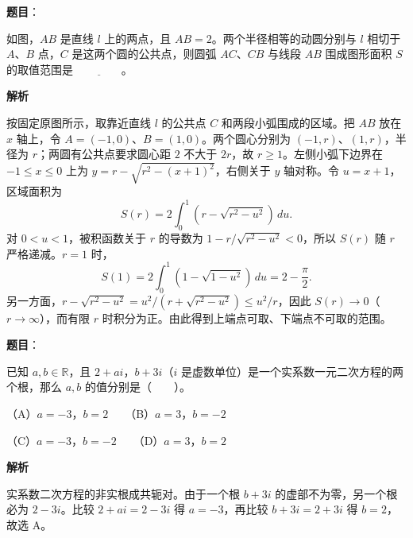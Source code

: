 \begin{answer}

\textbf{题目}：

如图，$AB$ 是直线 $l$ 上的两点，且 $AB=2$。两个半径相等的动圆分别与 $l$ 相切于 $A$、$B$ 点，$C$ 是这两个圆的公共点，则圆弧 $AC$、$CB$ 与线段 $AB$ 围成图形面积 $S$ 的取值范围是 $\underline{\qquad\qquad}$。
\nopagebreak[4]
\begin{center}\end{center}
\nopagebreak[4]
\textbf{解析}

按固定原图所示，取靠近直线 $l$ 的公共点 $C$ 和两段小弧围成的区域。把 $AB$ 放在 $x$ 轴上，令 $A=(-1,0)$、$B=(1,0)$。两个圆心分别为 $(-1,r)$、$(1,r)$，半径为 $r$；两圆有公共点要求圆心距 $2$ 不大于 $2r$，故 $r\ge1$。左侧小弧下边界在 $-1\le x\le0$ 上为 $y=r-\sqrt{r^2-(x+1)^2}$，右侧关于 $y$ 轴对称。令 $u=x+1$，区域面积为
\nopagebreak[4]
\[
S(r)=2\int_0^1\left(r-\sqrt{r^2-u^2}\right)\,du.
\]
对 $0<u<1$，被积函数关于 $r$ 的导数为 $1-r/\sqrt{r^2-u^2}<0$，所以 $S(r)$ 随 $r$ 严格递减。$r=1$ 时，
\nopagebreak[4]
\[
S(1)=2\int_0^1(1-\sqrt{1-u^2})\,du=2-\frac\pi2.
\]
另一方面，$r-\sqrt{r^2-u^2}=u^2/(r+\sqrt{r^2-u^2})\le u^2/r$，因此 $S(r)\to0$（$r\to\infty$），而有限 $r$ 时积分为正。由此得到上端点可取、下端点不可取的范围。


\end{answer}
\begin{answer}

\textbf{题目}：

已知 $a,b\in\mathbb{R}$，且 $2+ai$，$b+3i$（$i$ 是虚数单位）是一个实系数一元二次方程的两个根，那么 $a,b$ 的值分别是\mbox{（　　）}。

（A）$a=-3$，$b=2$　　（B）$a=3$，$b=-2$

（C）$a=-3$，$b=-2$　　（D）$a=3$，$b=2$

\textbf{解析}

实系数二次方程的非实根成共轭对。由于一个根 $b+3i$ 的虚部不为零，另一个根必为 $2-3i$。比较 $2+ai=2-3i$ 得 $a=-3$，再比较 $b+3i=2+3i$ 得 $b=2$，故选 A。


\end{answer}

